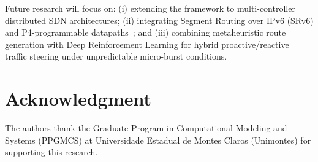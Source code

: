 \documentclass[journal]{IEEEtran}
\begin{document}
Future research will focus on: (i) extending the framework to multi-controller distributed SDN architectures; (ii) integrating Segment Routing over IPv6 (SRv6) and P4-programmable datapaths~\cite{cascone2020p4}; and (iii) combining metaheuristic route generation with Deep Reinforcement Learning for hybrid proactive/reactive traffic steering under unpredictable micro-burst conditions.

\section*{Acknowledgment}
The authors thank the Graduate Program in Computational Modeling and Systems (PPGMCS) at Universidade Estadual de Montes Claros (Unimontes) for supporting this research.



\end{document}

